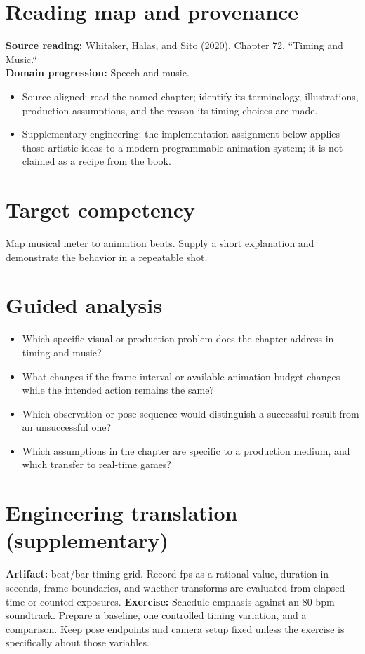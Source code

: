 \documentclass[10pt,letterpaper]{article}
\begin{document}
\makedoctitle
\makedocsummary

\section{Reading map and provenance}
\textbf{Source reading:} Whitaker, Halas, and Sito (2020), Chapter 72, ``Timing and Music.``\\
\textbf{Domain progression:} Speech and music.
\begin{itemize}
\item Source-aligned: read the named chapter; identify its terminology, illustrations, production assumptions, and the reason its timing choices are made.
\item Supplementary engineering: the implementation assignment below applies those artistic ideas to a modern programmable animation system; it is not claimed as a recipe from the book.
\end{itemize}
\section{Target competency}
Map musical meter to animation beats. Supply a short explanation and demonstrate the behavior in a repeatable shot.
\section{Guided analysis}
\begin{itemize}
\item Which specific visual or production problem does the chapter address in timing and music?
\item What changes if the frame interval or available animation budget changes while the intended action remains the same?
\item Which observation or pose sequence would distinguish a successful result from an unsuccessful one?
\item Which assumptions in the chapter are specific to a production medium, and which transfer to real-time games?
\end{itemize}
\section{Engineering translation (supplementary)}
\textbf{Artifact:} beat/bar timing grid. Record fps as a rational value, duration in seconds, frame boundaries, and whether transforms are evaluated from elapsed time or counted exposures.
\textbf{Exercise:} Schedule emphasis against an 80 bpm soundtrack. Prepare a baseline, one controlled timing variation, and a comparison. Keep pose endpoints and camera setup fixed unless the exercise is specifically about those variables.
\end{document}
